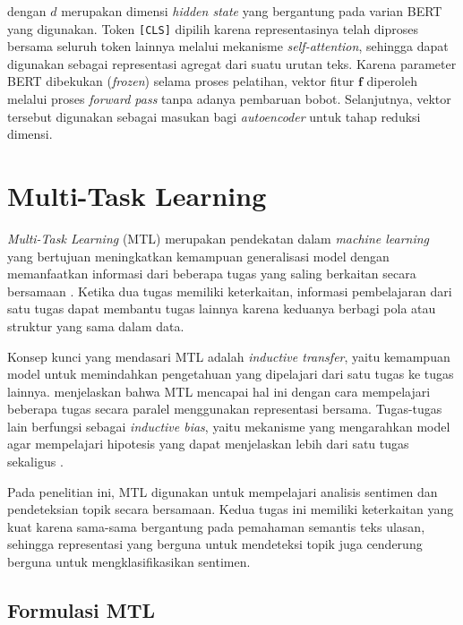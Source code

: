 \noindent dengan $d$ merupakan dimensi \textit{hidden state} yang bergantung pada varian BERT yang digunakan. Token \texttt{[CLS]} dipilih karena representasinya telah diproses bersama seluruh token lainnya melalui mekanisme \textit{self-attention}, sehingga dapat digunakan sebagai representasi agregat dari suatu urutan teks. Karena parameter BERT dibekukan (\textit{frozen}) selama proses pelatihan, vektor fitur $\mathbf{f}$ diperoleh melalui proses \textit{forward pass} tanpa adanya pembaruan bobot. Selanjutnya, vektor tersebut digunakan sebagai masukan bagi \textit{autoencoder} untuk tahap reduksi dimensi.

\section{Multi-Task Learning}

\textit{Multi-Task Learning} (MTL) merupakan pendekatan dalam
\textit{machine learning} yang bertujuan meningkatkan kemampuan
generalisasi model dengan memanfaatkan informasi dari beberapa tugas yang
saling berkaitan secara bersamaan \parencite{caruana1997multitask}. Ketika
dua tugas memiliki keterkaitan, informasi pembelajaran dari satu tugas
dapat membantu tugas lainnya karena keduanya berbagi pola atau struktur
yang sama dalam data.

Konsep kunci yang mendasari MTL adalah \textit{inductive transfer}, yaitu
kemampuan model untuk memindahkan pengetahuan yang dipelajari dari satu
tugas ke tugas lainnya. \parencite{caruana1997multitask} menjelaskan bahwa
MTL mencapai hal ini dengan cara mempelajari beberapa tugas secara paralel
menggunakan representasi bersama. Tugas-tugas lain berfungsi sebagai
\textit{inductive bias}, yaitu mekanisme yang mengarahkan model agar
mempelajari hipotesis yang dapat menjelaskan lebih dari satu tugas
sekaligus \parencite{ruder2017overview}.

Pada penelitian ini, MTL digunakan untuk mempelajari analisis sentimen dan
pendeteksian topik secara bersamaan. Kedua tugas ini memiliki keterkaitan
yang kuat karena sama-sama bergantung pada pemahaman semantis teks ulasan,
sehingga representasi yang berguna untuk mendeteksi topik juga cenderung
berguna untuk mengklasifikasikan sentimen.

\subsection{Formulasi MTL}

